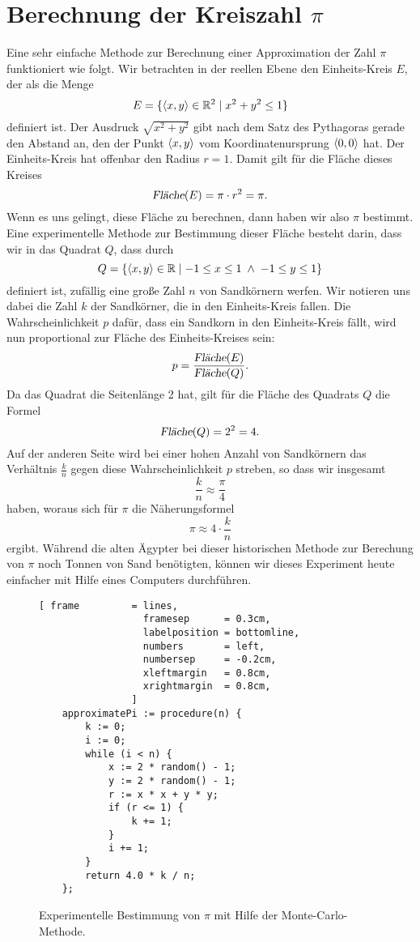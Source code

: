 \section[Computing $\pi$]{Berechnung der Kreiszahl $\pi$}
Eine sehr einfache Methode zur Berechnung einer Approximation der Zahl $\pi$ funktioniert wie folgt.
Wir betrachten in der reellen Ebene den Einheits-Kreis $E$, der als die Menge
\[ E = \{ \pair(x,y) \in \mathbb{R}^2 \mid x^2 + y^2 \leq 1 \} \]
definiert ist.  Der Ausdruck $\sqrt{x^2 + y^2}$ gibt nach dem Satz des Pythagoras gerade den Abstand an,
den der Punkt $\pair(x,y)$ vom Koordinatenursprung $\pair(0,0)$ hat.  Der Einheits-Kreis hat offenbar den
Radius $r = 1$.  Damit gilt f\"ur die Fl\"ache dieses Kreises
\[ \textsl{Fl\"ache}(E) = \pi \cdot r^2 = \pi. \]
Wenn es uns gelingt, diese Fl\"ache zu berechnen, dann haben wir also $\pi$ bestimmt.  Eine experimentelle
Methode zur Bestimmung dieser Fl\"ache besteht darin, dass wir in das Quadrat $Q$, dass durch
\[ Q = \{ \pair(x,y) \in \mathbb{R} \mid -1 \leq x \leq 1 \;\wedge\; -1 \leq y \leq 1 \} \]
definiert ist, zuf\"allig eine gro{\ss}e Zahl $n$ von Sandk\"ornern werfen.  Wir notieren uns dabei die Zahl $k$ 
der Sandk\"orner, die in den Einheits-Kreis fallen.  Die Wahrscheinlichkeit $p$ daf\"ur, dass ein Sandkorn in den
Einheits-Kreis f\"allt, wird nun proportional zur Fl\"ache des Einheits-Kreises sein:
\[ p = \frac{\textsl{Fl\"ache}(E)}{\textsl{Fl\"ache}(Q)}. \]
Da das Quadrat die Seitenl\"ange 2 hat, gilt f\"ur die Fl\"ache des Quadrats $Q$ die Formel
\[ \textsl{Fl\"ache}(Q) = 2^2 = 4. \]
Auf der anderen Seite wird bei einer hohen Anzahl von Sandk\"ornern das Verh\"altnis $\frac{k}{n}$ gegen diese
Wahrscheinlichkeit $p$ streben, so dass wir insgesamt
\[ \frac{k}{n} \approx \frac{\pi}{4} \]
haben, woraus sich f\"ur $\pi$ die N\"aherungsformel
\[ \pi \approx 4 \cdot \frac{k}{n} \]
ergibt.  W\"ahrend die alten \"Agypter bei dieser historischen Methode zur Berechung von $\pi$ noch Tonnen von
Sand ben\"otigten,  k\"onnen wir dieses Experiment heute einfacher mit Hilfe eines Computers durchf\"uhren.

\begin{figure}[!ht]
\centering
\begin{Verbatim}[ frame         = lines, 
                  framesep      = 0.3cm, 
                  labelposition = bottomline,
                  numbers       = left,
                  numbersep     = -0.2cm,
                  xleftmargin   = 0.8cm,
                  xrightmargin  = 0.8cm,
                ]
    approximatePi := procedure(n) {
        k := 0;  
        i := 0;
        while (i < n) {
            x := 2 * random() - 1;
            y := 2 * random() - 1;
            r := x * x + y * y;
            if (r <= 1) {
                k += 1;
            }
            i += 1;
        }
        return 4.0 * k / n;
    };
\end{Verbatim}
\vspace*{-0.3cm}
\caption{Experimentelle Bestimmung von $\pi$ mit Hilfe der Monte-Carlo-Methode.}
\label{fig:monte-carlo.stlx}
\end{figure}

